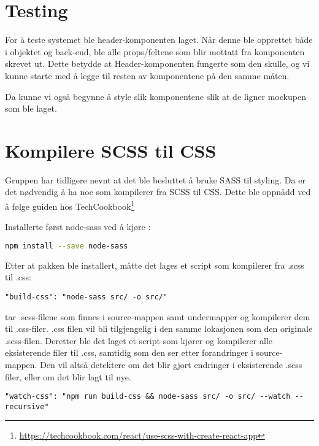\section{Testing}
For å teste systemet ble header-komponenten laget. Når denne ble opprettet både i objektet og back-end, ble alle props/feltene som blir mottatt fra komponenten skrevet ut. Dette betydde at Header-komponenten fungerte som den skulle, og vi kunne starte med å legge til resten av komponentene på den samme måten. 

Da kunne vi også begynne å style slik komponentene slik at de ligner mockupen som ble laget.

\section{Kompilere SCSS til CSS}
Gruppen har tidligere nevnt at det ble besluttet å bruke SASS til styling. Da er det nødvendig å ha noe som kompilerer fra SCSS til CSS. Dette ble oppnådd ved å følge guiden hos TechCookbook\footnote{\url{https://techcookbook.com/react/use-scss-with-create-react-app}}

Installerte først node-sass ved å kjøre :

\begin{lstlisting}[caption={Installering av node-sass},language=bash]
npm install --save node-sass
\end{lstlisting}

Etter at pakken ble installert, måtte det lages et script som kompilerer fra .scss til .css:

\begin{lstlisting}[caption={Kompliering fra .scss til .css}]
 "build-css": "node-sass src/ -o src/"
\end{lstlisting}
\clearpage

 tar .scss-filene som finnes i source-mappen samt undermapper og kompilerer dem til .css-filer. .css filen vil bli tilgjengelig i den samme lokasjonen som den originale .scss-filen. Deretter ble det laget et script som kjører  og kompilerer alle eksisterende filer til .css, samtidig som den ser etter forandringer i source-mappen. Den vil altså detektere om det blir gjort endringer i eksisterende .scss filer, eller om det blir lagt til nye. 

\begin{lstlisting}[caption={Script som detekterer endringer}]
 "watch-css": "npm run build-css && node-sass src/ -o src/ --watch --recursive"
\end{lstlisting}

